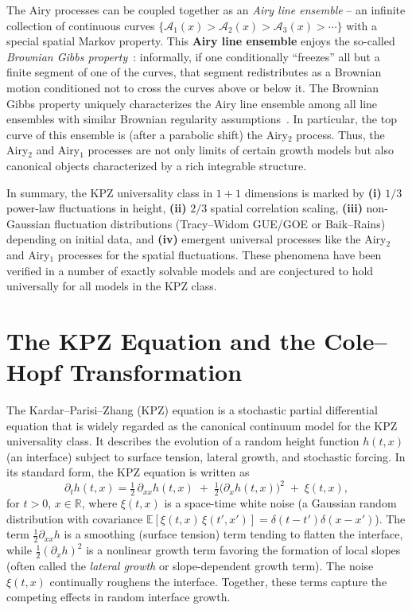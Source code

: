\documentclass[letterpaper,11pt,oneside,reqno]{article}
\numberwithin{equation}{section}
\theoremstyle{definition}
\begin{document}
The Airy processes can be coupled together as an \emph{Airy line ensemble} – an infinite collection of continuous curves $\{\mathcal{A}_1(x) > \mathcal{A}_2(x) > \mathcal{A}_3(x) > \cdots\}$ with a special spatial Markov property. This \textbf{Airy line ensemble} enjoys the so-called \emph{Brownian Gibbs property} \cite{CorwinHammond2013}: informally, if one conditionally “freezes” all but a finite segment of one of the curves, that segment redistributes as a Brownian motion conditioned not to cross the curves above or below it. The Brownian Gibbs property uniquely characterizes the Airy line ensemble among all line ensembles with similar Brownian regularity assumptions \cite{AggarwalHuang2023Characterization}. In particular, the top curve of this ensemble is (after a parabolic shift) the Airy$_2$ process. Thus, the Airy$_2$ and Airy$_1$ processes are not only limits of certain growth models but also canonical objects characterized by a rich integrable structure.

In summary, the KPZ universality class in $1+1$ dimensions is marked by \textbf{(i)} $1/3$ power-law fluctuations in height, \textbf{(ii)} $2/3$ spatial correlation scaling, \textbf{(iii)} non-Gaussian fluctuation distributions (Tracy–Widom GUE/GOE or Baik–Rains) depending on initial data, and \textbf{(iv)} emergent universal processes like the Airy$_2$ and Airy$_1$ processes for the spatial fluctuations. These phenomena have been verified in a number of exactly solvable models and are conjectured to hold universally for all models in the KPZ class.

\section{The KPZ Equation and the Cole--Hopf Transformation}
The Kardar–Parisi–Zhang (KPZ) equation is a stochastic partial differential equation that is widely regarded as the canonical continuum model for the KPZ universality class. It describes the evolution of a random height function $h(t,x)$ (an interface) subject to surface tension, lateral growth, and stochastic forcing. In its standard form, the KPZ equation is written as
\begin{equation}\label{eq:KPZ}
\partial_t h(t,x) = \tfrac{1}{2}\,\partial_{xx} h(t,x)\;+\; \tfrac{1}{2}\big(\partial_x h(t,x)\big)^2 \;+\; \xi(t,x),
\end{equation}
for $t>0$, $x\in\mathbb{R}$, where $\xi(t,x)$ is a space-time white noise (a Gaussian random distribution with covariance $\mathbb{E}[\xi(t,x)\,\xi(t',x')] = \delta(t-t')\delta(x-x')$). The term $\frac{1}{2}\partial_{xx}h$ is a smoothing (surface tension) term tending to flatten the interface, while $\frac{1}{2}(\partial_x h)^2$ is a nonlinear growth term favoring the formation of local slopes (often called the \emph{lateral growth} or slope-dependent growth term). The noise $\xi(t,x)$ continually roughens the interface. Together, these terms capture the competing effects in random interface growth.
\end{document}

